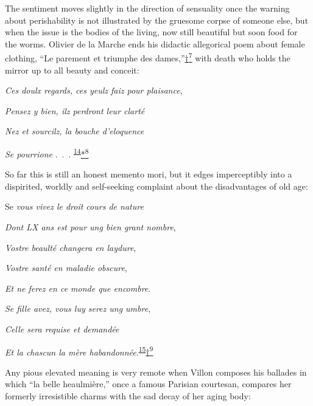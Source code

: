 The sentiment moves slightly in the direction of sensuality once the
warning about perishability is not illustrated by the gruesome corpse of
someone else, but when the issue is the bodies of the living, now still
beautiful but soon food for the worms. Olivier de la Marche ends his
didactic allegorical poem about female clothing, ``Le parement et
triumphe des
dames,''\protect\hypertarget{12_Chapter_Five__THE_VISION_OF_DEAT.xhtmlux5cux23id_2963}{\protect\hyperlink{23_NOTES.xhtmlux5cux23id_2964}{†\textsuperscript{7}}}
with death who holds the mirror up to all beauty and conceit:

\emph{\protect\hypertarget{12_Chapter_Five__THE_VISION_OF_DEAT.xhtmlux5cux23page_162}{}{}Ces
doulx regards, ces yeulz faiz pour plaisance},

\emph{Pensez y bien, ilz perdront leur clarté}

\emph{Nez et sourcilz, la bouche d'eloquence}

\emph{Se pourrione} .~.~.
\textsuperscript{\protect\hypertarget{12_Chapter_Five__THE_VISION_OF_DEAT.xhtmlux5cux23id_1324}{\protect\hyperlink{23_NOTES.xhtmlux5cux23id_1325}{14}}}\protect\hypertarget{12_Chapter_Five__THE_VISION_OF_DEAT.xhtmlux5cux23id_2965}{\protect\hyperlink{23_NOTES.xhtmlux5cux23id_2966}{*\textsuperscript{8}}}

So far this is still an honest memento mori, but it edges imperceptibly
into a dispirited, worldly and self-seeking complaint about the
disadvantages of old age:

Se \emph{vous vivez le droit cours de nature}

\emph{Dont LX ans est pour ung bien grant nombre},

\emph{Vostre beaulté changera en laydure},

\emph{Vostre santé en maladie obscure},

\emph{Et ne ferez en ce monde que encombre}.

\emph{Se fille avez, vous luy serez ung umbre},

\emph{Celle sera requise et demandée}

\emph{Et la chascun la mère
habandonnée}.\textsuperscript{\protect\hypertarget{12_Chapter_Five__THE_VISION_OF_DEAT.xhtmlux5cux23id_1322}{\protect\hyperlink{23_NOTES.xhtmlux5cux23id_1323}{15}}}\protect\hypertarget{12_Chapter_Five__THE_VISION_OF_DEAT.xhtmlux5cux23id_2967}{\protect\hyperlink{23_NOTES.xhtmlux5cux23id_2968}{†\textsuperscript{9}}}

Any pious elevated meaning is very remote when Villon composes his
ballades in which ``la belle heaulmière,'' once a famous Parisian
courtesan, compares her formerly irresistible charms with the sad decay
of her aging body:

